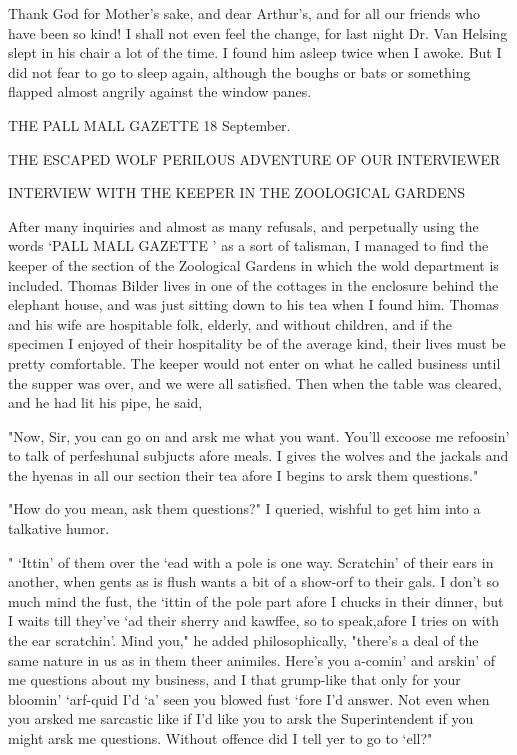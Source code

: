 Thank God for Mother's sake, and dear Arthur's, and for all our friends who have been so kind! I shall not even feel the change, for last night Dr. Van Helsing slept in his chair a lot of the time. I found him asleep twice when I awoke. But I did not fear to go to sleep again, although the boughs or bats or something flapped almost angrily against the window panes. 

THE PALL MALL GAZETTE 18 September. 

THE ESCAPED WOLF PERILOUS ADVENTURE OF OUR INTERVIEWER 

INTERVIEW WITH THE KEEPER IN THE ZOOLOGICAL GARDENS 

After many inquiries and almost as many refusals, and perpetually using the words `PALL MALL GAZETTE ' as a sort of talisman, I managed to find the keeper of the section of the Zoological Gardens in which the wold department is included. Thomas Bilder lives in one of the cottages in the enclosure behind the elephant house, and was just sitting down to his tea when I found him. Thomas and his wife are hospitable folk, elderly, and without children, and if the specimen I enjoyed of their hospitality be of the average kind, their lives must be pretty comfortable. The keeper would not enter on what he called business until the supper was over, and we were all satisfied. Then when the table was cleared, and he had lit his pipe, he said, 

"Now, Sir, you can go on and arsk me what you want. You'll excoose me refoosin' to talk of perfeshunal subjucts afore meals. I gives the wolves and the jackals and the hyenas in all our section their tea afore I begins to arsk them questions." 

"How do you mean, ask them questions?" I queried, wishful to get him into a talkative humor. 

" `Ittin' of them over the `ead with a pole is one way. Scratchin' of their ears in another, when gents as is flush wants a bit of a show-orf to their gals. I don't so much mind the fust, the `ittin of the pole part afore I chucks in their dinner, but I waits till they've `ad their sherry and kawffee, so to speak,afore I tries on with the ear scratchin'. Mind you," he added philosophically, "there's a deal of the same nature in us as in them theer animiles. Here's you a-comin' and arskin' of me questions about my business, and I that grump-like that only for your bloomin' `arf-quid I'd `a' seen you blowed fust `fore I'd answer. Not even when you arsked me sarcastic like if I'd like you to arsk the Superintendent if you might arsk me questions. Without offence did I tell yer to go to `ell?" 

